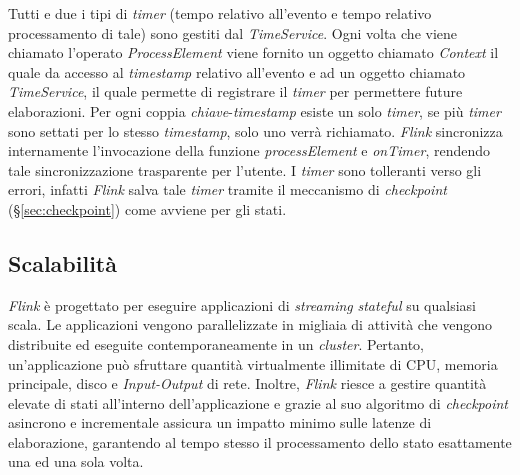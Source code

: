 \label{sec:timer}
\noindent Tutti e due i tipi di \textit{timer} (tempo relativo all'evento e tempo relativo processamento di tale) sono gestiti dal \textit{TimeService}. Ogni volta che viene chiamato l'operato \textit{ProcessElement} viene fornito un oggetto chiamato \textit{Context} il quale da accesso al \textit{\gls{timestamp}} relativo all'evento e ad un oggetto chiamato \textit{TimeService}, il quale permette di registrare il \textit{timer} per permettere future elaborazioni. Per ogni coppia \textit{chiave}-\textit{\gls{timestamp}} esiste un solo \textit{timer}, se più \textit{timer} sono settati per lo stesso \textit{\gls{timestamp}}, solo uno verrà richiamato. \textit{Flink} sincronizza internamente l'invocazione della funzione \textit{processElement} e \textit{onTimer}, rendendo tale sincronizzazione trasparente per l'utente. I \textit{timer} sono tolleranti verso gli errori, infatti \textit{Flink} salva tale \textit{timer} tramite il meccanismo di \textit{checkpoint} (\S\ref{sec:checkpoint}) come avviene per gli stati.


\subsection{Scalabilità}
\textit{Flink} è progettato per eseguire applicazioni di \textit{streaming} \textit{\gls{stateful}} su qualsiasi scala. Le applicazioni vengono parallelizzate in migliaia di attività che vengono distribuite ed eseguite contemporaneamente in un \textit{\gls{cluster}}. Pertanto, un'applicazione può sfruttare quantità virtualmente illimitate di CPU, memoria principale, disco e \textit{Input-Output} di rete. Inoltre, \textit{Flink} riesce a gestire quantità elevate di stati all'interno dell'applicazione e grazie al suo algoritmo di \textit{checkpoint} asincrono e incrementale assicura un impatto minimo sulle latenze di elaborazione, garantendo al tempo stesso il processamento dello stato esattamente una ed una sola volta.

